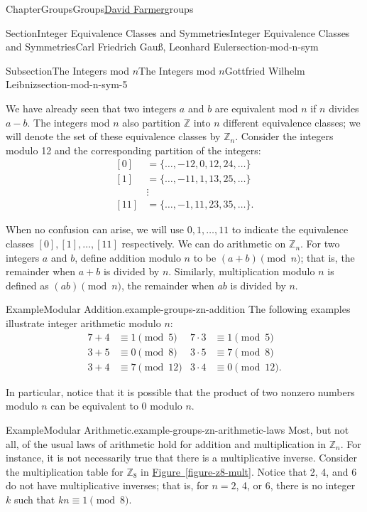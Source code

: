 \documentclass[oneside,10pt,]{book}
\newcommand{\xreffont}{\relax}
\numberwithin{equation}{section}
\begin{document}
\begin{chapterptx}{Chapter}{Groups}{}{Groups}{\hyperlink{dfarmer}{David Farmer}}{}{groups}
\begin{sectionptx}{Section}{Integer Equivalence Classes and Symmetries}{}{Integer Equivalence Classes and Symmetries}{Carl Friedrich Gauß, Leonhard Euler}{}{section-mod-n-sym}
\begin{subsectionptx}{Subsection}{The Integers mod \(n\)}{}{The Integers mod \(n\)}{Gottfried Wilhelm Leibniz}{}{section-mod-n-sym-5}
\par
We have already seen that two integers \(a\) and \(b\) are equivalent mod \(n\) if \(n\) divides \(a - b\).  The integers mod \(n\) also partition \({\mathbb Z}\) into \(n\) different equivalence classes; we will denote the set of these equivalence classes by \({\mathbb Z}_n\). \label{section-mod-n-sym-5-4-10} Consider the integers modulo 12 and the corresponding partition of the integers:%
\begin{align*}
{[0]} & = \{ \ldots, -12, 0, 12, 24, \ldots \}\\
{[1]} & = \{ \ldots, -11, 1, 13, 25, \ldots \}\\
& \vdots\\
{[11]} & = \{ \ldots, -1, 11, 23, 35, \ldots \}\text{.}
\end{align*}
%
\par
When no confusion can arise, we will use \(0, 1, \ldots, 11\) to indicate the equivalence classes  \({[0]}, {[1]}, \ldots, {[11]}\) respectively.  We can do arithmetic on \({\mathbb Z}_n\).  For two integers \(a\) and \(b\), define addition modulo \(n\) to be \((a + b) \pmod{n}\); that is, the remainder when \(a + b\) is divided by \(n\).  Similarly, multiplication modulo \(n\) is defined as \((a  b) \pmod{ n}\), the remainder when \(a  b\) is divided by \(n\).%
\begin{example}{Example}{Modular Addition.}{example-groups-zn-addition}%
The following examples illustrate integer arithmetic modulo \(n\):%
\begin{align*}
7 + 4  & \equiv  1 \pmod{ 5}   & 7 \cdot 3 & \equiv 1 \pmod{ 5}\\
3 + 5  & \equiv  0 \pmod{ 8}   & 3 \cdot 5 & \equiv 7 \pmod{ 8}\\
3 + 4  & \equiv  7 \pmod{ 12}  & 3 \cdot 4 & \equiv 0 \pmod{ 12}\text{.}
\end{align*}
%
\par
In particular, notice that it is possible that the product of two nonzero numbers modulo \(n\) can be equivalent to \(0 \) modulo \(n\).%
\end{example}
\begin{example}{Example}{Modular Arithmetic.}{example-groups-zn-arithmetic-laws}%
Most, but not all, of the usual laws of arithmetic hold for addition and multiplication in \({\mathbb Z}_n\).  For instance, it is not necessarily true that there is a multiplicative inverse.  Consider the multiplication table for \({\mathbb Z}_8\) in \hyperref[figure-z8-mult]{Figure~{\xreffont\ref{figure-z8-mult}}}.  Notice that 2, 4, and 6 do not have multiplicative inverses; that is, for \(n = 2\), 4, or 6, there is no integer \(k\) such that \(k n \equiv 1 \pmod{ 8}\).%

\end{example}
\end{subsectionptx}
\end{sectionptx}
\end{chapterptx}
\end{document}
